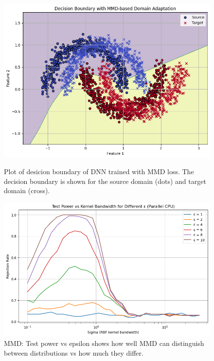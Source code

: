 \documentclass{article}
\begin{document}
\begin{figure}
  \centering
  \begin{minipage}{0.3\textwidth}
    \centering
    \includegraphics[width=\textwidth]{MMD/adaptation.png}
    \caption{Plot of desicion boundary of DNN trained with MMD loss. The decision boundary is shown for the source domain (dots) and target domain (cross).}
    \label{fig:mmd}
  \end{minipage}
  \hfill
  \begin{minipage}{0.35\textwidth}
    \centering
    \includegraphics[width=\textwidth]{MMD/Test_powe_vs_eps.png}
    \caption{MMD: Test power vs epsilon shows how well MMD can distinguish between distributions vs how much they differ.}
    \label{fig:mmd_power}
  \end{minipage}
  \hfill
  \begin{minipage}{0.25\textwidth}

\end{minipage}
\end{figure}
\end{document}
